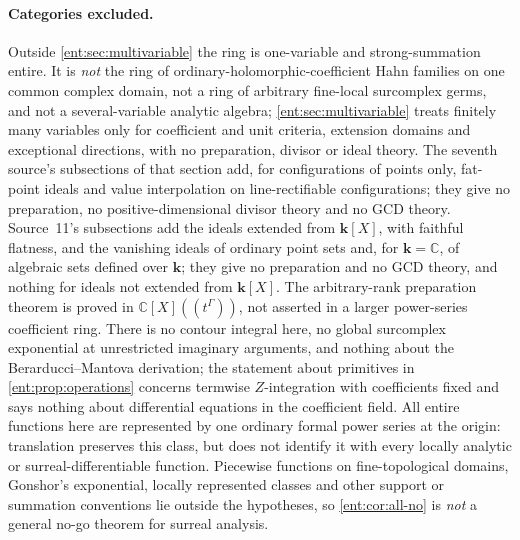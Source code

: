 \documentclass[11pt]{article}
\theoremstyle{plain}
\theoremstyle{plain}
\theoremstyle{plain}
\theoremstyle{definition}
\theoremstyle{definition}
\theoremstyle{definition}
\theoremstyle{definition}
\theoremstyle{remark}
\newcommand{\C}{\mathbb C}\newcommand{\R}{\mathbb R}
\newcommand{\kk}{\mathbf k}\newcommand{\PP}{\mathbb P}
\begin{document}
\paragraph{Categories excluded.}
Outside \cref{ent:sec:multivariable} the ring is one-variable and
strong-summation entire. It is \emph{not} the ring of
ordinary-holomorphic-coefficient Hahn families on one common complex domain,
not a ring of arbitrary fine-local surcomplex germs, and not a
several-variable analytic algebra; \cref{ent:sec:multivariable} treats
finitely many variables only for coefficient and unit criteria, extension
domains and exceptional directions, with no preparation, divisor or ideal
theory. The seventh source's subsections of that section add,
for configurations of points only, fat-point ideals and value interpolation on
line-rectifiable configurations; they give no preparation, no
positive-dimensional divisor theory and no GCD theory. Source~11's
subsections add the ideals extended from $\kk[X]$, with faithful flatness, and
the vanishing ideals of ordinary point sets and, for $\kk=\C$, of algebraic
sets defined over $\kk$; they give no preparation and no GCD theory, and
nothing for ideals not extended from $\kk[X]$. The arbitrary-rank
preparation theorem is
proved in $\C[X]((t^\Gamma))$, not asserted in a larger power-series
coefficient ring. There is no contour integral here, no global surcomplex
exponential at unrestricted imaginary arguments, and nothing about the
Berarducci--Mantova derivation; the statement about primitives in
\cref{ent:prop:operations} concerns termwise $Z$-integration with
coefficients fixed and says nothing about differential equations in the
coefficient field. All entire functions here are represented by one ordinary
formal power series at the origin: translation preserves this class, but does
not identify it with every locally analytic or surreal-differentiable
function. Piecewise functions on fine-topological domains, Gonshor's
exponential, locally represented classes and other support or summation
conventions lie outside the hypotheses, so
\cref{ent:cor:all-no} is \emph{not} a general no-go theorem for surreal
analysis.
\end{document}
